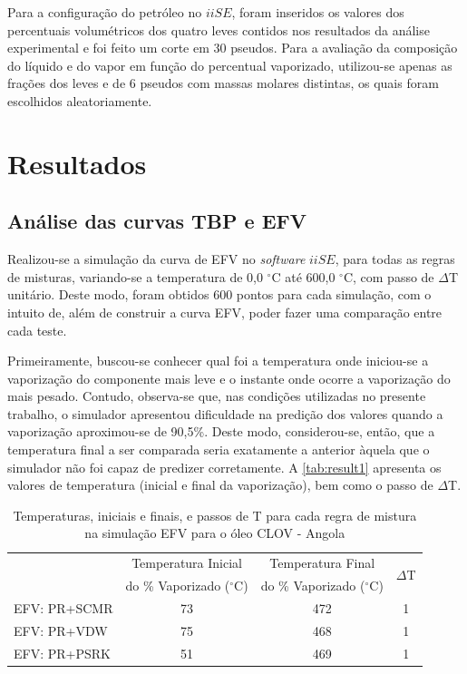 Para a configuração do petróleo no $iiSE$, foram inseridos os valores dos
percentuais volumétricos dos quatro leves contidos nos resultados da análise experimental e
foi feito um corte em 30 pseudos. Para a avaliação da composição do líquido e do
vapor em função do percentual vaporizado, utilizou-se apenas as frações dos
leves e de 6 pseudos com massas molares distintas, os quais foram escolhidos
aleatoriamente.

\clearpage 

\section{Resultados}

\subsection{Análise das curvas TBP e EFV} 

Realizou-se a simulação da curva de EFV no \emph{software} $iiSE$, para todas as
regras de misturas, variando-se a temperatura de 0,0 $^\circ$C até 600,0
$^\circ$C, com passo de $\Delta$T unitário. Deste modo, foram obtidos 600 pontos
para cada simulação, com o intuito de, além de construir a curva EFV, poder
fazer uma comparação entre cada teste.

Primeiramente, buscou-se conhecer qual foi a temperatura onde iniciou-se a
vaporização do componente mais leve e o instante onde ocorre a vaporização do
mais pesado. Contudo, observa-se que, nas condições utilizadas no presente
trabalho, o simulador apresentou dificuldade na predição dos valores quando a
vaporização aproximou-se de 90,5{\%}. Deste modo, considerou-se, então, que a
temperatura final a ser comparada seria exatamente a anterior àquela que o
simulador não foi capaz de predizer corretamente. A \autoref{tab:result1}
apresenta os valores de temperatura (inicial e final da vaporização), bem como o
passo de $\Delta$T.

\begin{table}[htb]
\renewcommand{\arraystretch}{1.3}
\caption{Temperaturas, iniciais e finais, e passos de T para cada regra de
mistura na simulação EFV para o óleo CLOV - Angola}
\footnotesize
\center 
\begin{tabular}{lccc}   
\toprule
   &{Temperatura Inicial}&{Temperatura Final}&\multirow{2}{*}{$\Delta$T} \\
  &{do \% Vaporizado ($^\circ$C)}&{do \% Vaporizado
   ($^\circ$C)} & \\
\midrule 
{EFV: PR+SCMR}	&	73	&	472		&	1 \\
{EFV: PR+VDW}	&	75	&	468		&	1 \\
{EFV: PR+PSRK}	&	51	&	469		&	1 \\
\bottomrule
\end{tabular}
\label{tab:result1}
\end{table}

